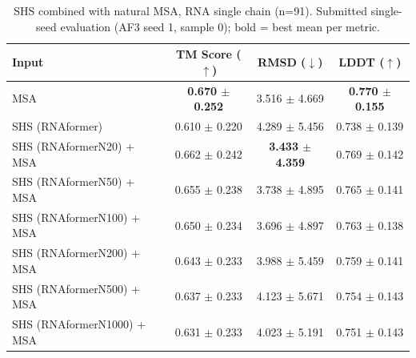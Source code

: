 \begin{table}[htbp]
\centering
\caption{SHS combined with natural MSA, RNA single chain (n=91). Submitted single-seed evaluation (AF3 seed 1, sample 0); bold = best mean per metric.}
\label{tab:shs_and_msa_depth_sweep}
\begin{tabular}{lccc}
\toprule
Input & TM Score ($\uparrow$) & RMSD ($\downarrow$) & LDDT ($\uparrow$) \\
\midrule
MSA & \textbf{0.670 $\pm$ 0.252} & 3.516 $\pm$ 4.669 & \textbf{0.770 $\pm$ 0.155} \\
SHS (RNAformer) & 0.610 $\pm$ 0.220 & 4.289 $\pm$ 5.456 & 0.738 $\pm$ 0.139 \\
SHS (RNAformerN20) + MSA & 0.662 $\pm$ 0.242 & \textbf{3.433 $\pm$ 4.359} & 0.769 $\pm$ 0.142 \\
SHS (RNAformerN50) + MSA & 0.655 $\pm$ 0.238 & 3.738 $\pm$ 4.895 & 0.765 $\pm$ 0.141 \\
SHS (RNAformerN100) + MSA & 0.650 $\pm$ 0.234 & 3.696 $\pm$ 4.897 & 0.763 $\pm$ 0.138 \\
SHS (RNAformerN200) + MSA & 0.643 $\pm$ 0.233 & 3.988 $\pm$ 5.459 & 0.759 $\pm$ 0.141 \\
SHS (RNAformerN500) + MSA & 0.637 $\pm$ 0.233 & 4.123 $\pm$ 5.671 & 0.754 $\pm$ 0.143 \\
SHS (RNAformerN1000) + MSA & 0.631 $\pm$ 0.233 & 4.023 $\pm$ 5.191 & 0.751 $\pm$ 0.143 \\
\bottomrule
\end{tabular}
\end{table}

